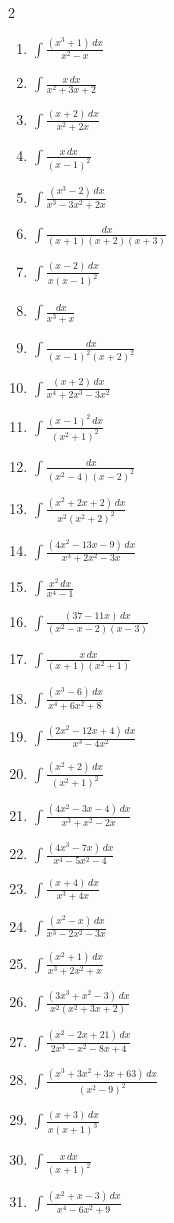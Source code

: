 \documentclass[12pt, letterpaper]{article}
\newcommand{\dx}{\,dx}
\begin{document}
\begin{multicols}{2}
\begin{enumerate}[leftmargin=*, resume]
  \item \medio{} $\int \frac{(x^3+1) \dx}{x^2-x}$
  \item \facil{} $\int \frac{x \dx}{x^2+3x+2}$
  \item \facil{} $\int \frac{(x+2) \dx}{x^2+2x}$
  \item \facil{} $\int \frac{x \dx}{(x-1)^2}$
  \item \medio{} $\int \frac{(x^3-2) \dx}{x^3-3x^2+2x}$
  \item \facil{} $\int \frac{\dx}{(x+1)(x+2)(x+3)}$
  \item \medio{} $\int \frac{(x-2) \dx}{x(x-1)^2}$
  \item \facil{} $\int \frac{\dx}{x^3+x}$
  \item \medio{} $\int \frac{\dx}{(x-1)^2(x+2)^2}$
  \item \medio{} $\int \frac{(x+2) \dx}{x^4+2x^3-3x^2}$
  \item \dificil{} $\int \frac{(x-1)^2 \dx}{(x^2+1)^2}$
  \item \dificil{} $\int \frac{\dx}{(x^2-4)(x-2)^2}$
  \item \dificil{} $\int \frac{(x^2+2x+2) \dx}{x^2(x^2+2)^2}$
  \item \medio{} $\int \frac{(4x^2-13x-9) \dx}{x^3+2x^2-3x}$
  \item \medio{} $\int \frac{x^2 \dx}{x^4-1}$
  \item \medio{} $\int \frac{(37-11x) \dx}{(x^2-x-2)(x-3)}$
  \item \medio{} $\int \frac{x \dx}{(x+1)(x^2+1)}$
  \item \dificil{} $\int \frac{(x^3-6) \dx}{x^4+6x^2+8}$
  \item \medio{} $\int \frac{(2x^2-12x+4) \dx}{x^3-4x^2}$
  \item \dificil{} $\int \frac{(x^2+2) \dx}{(x^2+1)^2}$
  \item \medio{} $\int \frac{(4x^2-3x-4) \dx}{x^3+x^2-2x}$
  \item \dificil{} $\int \frac{(4x^3-7x) \dx}{x^4-5x^2-4}$
  \item \facil{} $\int \frac{(x+4) \dx}{x^3+4x}$
  \item \facil{} $\int \frac{(x^2-x) \dx}{x^3-2x^2-3x}$
  \item \facil{} $\int \frac{(x^2+1) \dx}{x^3+2x^2+x}$
  \item \medio{} $\int \frac{(3x^3+x^2-3) \dx}{x^2(x^2+3x+2)}$
  \item \medio{} $\int \frac{(x^2-2x+21) \dx}{2x^3-x^2-8x+4}$
  \item \dificil{} $\int \frac{(x^3+3x^2+3x+63) \dx}{(x^2-9)^2}$
  \item \dificil{} $\int \frac{(x+3) \dx}{x(x+1)^3}$
  \item \facil{} $\int \frac{x \dx}{(x+1)^2}$
  \item \dificil{} $\int \frac{(x^2+x-3) \dx}{x^4-6x^2+9}$
\end{enumerate}
\end{multicols}
\end{document}
